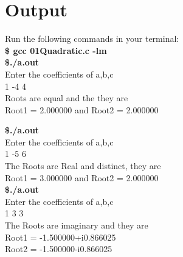 \documentclass[a4paper]{report}
\begin{document}
\section*{Output}
Run the following commands in your terminal:\\
\textbf{\$ gcc 01Quadratic.c -lm \\ \$./a.out \\}
Enter the coefficients of a,b,c\\
1 -4 4\\
Roots are equal and the they are\\
Root1 = 2.000000 and Root2 = 2.000000

\textbf{\$./a.out \\}
Enter the coefficients of a,b,c\\
1 -5 6\\
The Roots are Real and distinct, they are\\
Root1 = 3.000000 and Root2 = 2.000000\\

\textbf{\$./a.out \\}
Enter the coefficients of a,b,c\\
1 3 3\\
The Roots are imaginary and they are\\
Root1 = -1.500000+i0.866025\\
Root2 = -1.500000-i0.866025\\
\end{document}
